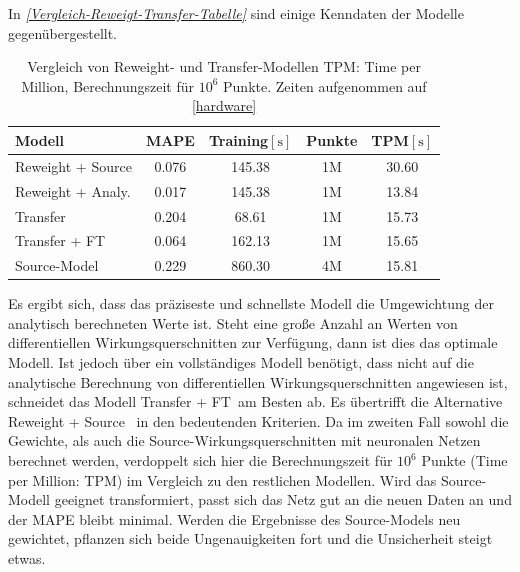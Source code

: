In \textit{\autoref{Vergleich-Reweigt-Transfer-Tabelle}} sind einige Kenndaten der Modelle gegenübergestellt.
\begin{table} 
	\centering
	\begin{tabular}{|l|c|c|c|c|}
		\hline
		Modell & MAPE & Training$[\text{s}]$ & Punkte & TPM$[\text{s}]$ \\
		\hline
		Reweight + Source & 0.076 & 145.38 & 1M & 30.60 \\
		Reweight + Analy. &  0.017 & 145.38 & 1M & 13.84 \\
		Transfer & 0.204 & 68.61 & 1M & 15.73\\
		Transfer + FT & 0.064 & 162.13 & 1M & 15.65 \\
		Source-Model & 0.229 & 860.30 & 4M & 15.81\\
		\hline
	\end{tabular}
	\caption{Vergleich von Reweight- und Transfer-Modellen TPM: Time per Million, Berechnungszeit für $10^{6}$ Punkte. Zeiten aufgenommen auf \textsf{\autoref{hardware}}}
	\label{Vergleich-Reweigt-Transfer-Tabelle}
\end{table}
Es ergibt sich, dass das präziseste und schnellste Modell die Umgewichtung der analytisch berechneten Werte ist. Steht eine große Anzahl an Werten von differentiellen Wirkungsquerschnitten zur Verfügung, dann ist dies das optimale Modell. Ist jedoch über ein vollständiges Modell benötigt, dass nicht auf die analytische Berechnung von differentiellen Wirkungsquerschnitten angewiesen ist, schneidet das Modell \glqq Transfer + FT\grqq~am Besten ab. Es übertrifft die Alternative \glqq Reweight + Source\grqq~ in den bedeutenden Kriterien. Da im zweiten Fall sowohl die Gewichte, als auch die Source-Wirkungsquerschnitten mit neuronalen Netzen berechnet werden, verdoppelt sich hier die Berechnungszeit für $10^{6}$ Punkte (Time per Million: TPM) im Vergleich zu den restlichen Modellen. Wird das Source-Modell geeignet transformiert, passt sich das Netz gut an die neuen Daten an und der MAPE bleibt minimal. Werden die Ergebnisse des Source-Models neu gewichtet, pflanzen sich beide Ungenauigkeiten fort und die Unsicherheit steigt etwas.

